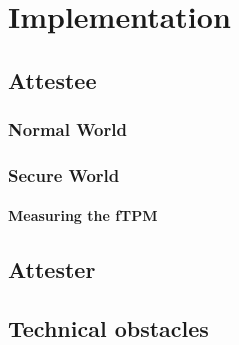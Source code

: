 
\chapter{Implementation}\label{chapter:implementation}

\section{Attestee}
\subsection{Normal World}

\subsection{Secure World}

\subsubsection{Measuring the fTPM}

\section{Attester}

\section{Technical obstacles}
